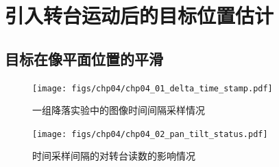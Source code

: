\section{引入转台运动后的目标位置估计}
\subsection{目标在像平面位置的平滑}



\begin{figure}[htb]   
	\centering
	\texttt{[image: figs/chp04/chp04\_01\_delta\_time\_stamp.pdf]}
	\caption{一组降落实验中的图像时间间隔采样情况}
	\label{fig:chp04_01_delta_time_stamp}
\end{figure}

\begin{figure}[htb]   
	\centering
	\texttt{[image: figs/chp04/chp04\_02\_pan\_tilt\_status.pdf]}
	\caption{时间采样间隔的对转台读数的影响情况}
	\label{fig:chp04_02_pan_tilt_status}
\end{figure}